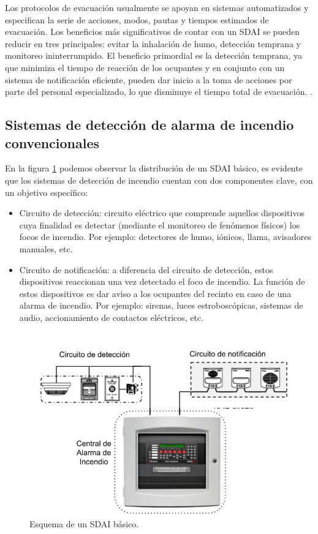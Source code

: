 Los protocolos de evacuación usualmente se apoyan en sistemas automatizados y especifican la serie de acciones, modos, pautas y tiempos estimados de evacuación. Los beneficios más significativos de contar con un SDAI se pueden reducir en tres principales: evitar la inhalación de humo, detección temprana y monitoreo ininterrumpido. El beneficio primordial es la detección temprana, ya que minimiza el tiempo de reacción de los ocupantes y en conjunto con un sistema de notificación eficiente, pueden dar inicio a la toma de acciones por parte del personal especializado, lo que disminuye el tiempo total de evacuación. \citep{utn_1}\citep{plan_evac}.
\subsection{Sistemas de detección de alarma de incendio convencionales}
%

En la figura \ref{fig:sdai_conv} podemos observar la distribución de un SDAI básico, es evidente que los sistemas de detección de incendio cuentan con dos componentes clave, con un objetivo específico:
\begin{itemize}
\item Circuito de detección: circuito eléctrico que comprende aquellos dispositivos cuya finalidad es detectar (mediante el monitoreo de fenómenos físicos) los focos de incendio. Por ejemplo: detectores de humo, iónicos, llama, avisadores manuales, etc.
\item Circuito de notificación: a diferencia del circuito de detección, estos dispositivos reaccionan una vez detectado el foco de incendio. La función de estos dispositivos es dar aviso a los ocupantes del recinto en caso de una alarma de incendio. Por ejemplo: sirenas, luces estroboscópicas, sistemas de audio, accionamiento de contactos eléctricos, etc.
\end{itemize}
\begin{figure}[ht]
    \centering
    \includegraphics[scale=.45]{./Figures/sdai_conv.jpg}
    \caption{Esquema de un SDAI básico.}
    \label{fig:sdai_conv}
\end{figure}

